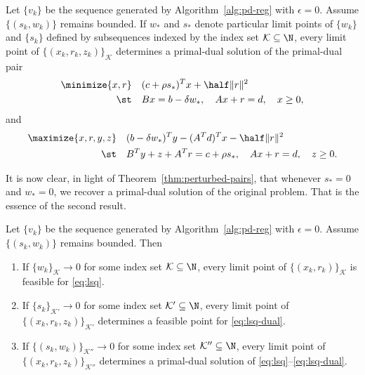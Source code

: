 \documentclass{amsart}
\begin{document}
\begin{btheorem}
  \label{thm:perturbed-pairs}
  Let $\{v_k\}$ be the sequence generated by Algorithm~\ref{alg:pd-reg} with
  $\epsilon = 0$. Assume $\{(s_k, w_k)\}$ remains bounded. If $w_*$ and $s_*$
  denote particular limit points of $\{w_k\}$ and $\{s_k\}$ defined by
  subsequences indexed by the index set $\mathcal{K} \subseteq \N$, every limit
  point of $\{(x_k,r_k,z_k)\}_{\mathcal{K}}$ determines a primal-dual solution
  of the primal-dual pair
  \begin{equation}
    \label{eq:lsq-r-perturbed}
    \begin{aligned}
      \minimize{x, r} \quad & (c + \rho s_*)^T x + \half \|r\|^2 \\
      \st \quad & Bx = b - \delta w_*, \quad Ax + r = d, \quad x \geq 0,
    \end{aligned}
  \end{equation}
  and
  \begin{equation}
    \label{eq:lsq-r-dual-perturbed}
    \begin{aligned}
      \maximize{x, r, y, z} \quad &
        (b - \delta w_*)^T y - (A^T d)^T x - \half \|r\|^2 \\
      \st \quad & B^T y + z + A^T r = c + \rho s_*, \quad
                  Ax + r = d, \quad z \geq 0.
    \end{aligned}
  \end{equation}
\end{btheorem}

It is now clear, in light of Theorem~\ref{thm:perturbed-pairs}, that whenever
$s_* = 0$ and $w_* = 0$, we recover a primal-dual solution of the original
problem. That is the essence of the second result.

\begin{btheorem}
  \label{thm:limit-points}
  Let $\{v_k\}$ be the sequence generated by Algorithm~\ref{alg:pd-reg} with
  $\epsilon = 0$. Assume $\{(s_k, w_k)\}$ remains bounded. Then
  \begin{enumerate}
    \item If $\{w_k\}_{\mathcal{K}} \to 0$ for some index set $\mathcal{K}
      \subseteq \N$, every limit point of $\{(x_k,r_k)\}_{\mathcal{K}}$ is
      feasible for \eqref{eq:lsq}.
    \item If $\{s_k\}_{\mathcal{K}'} \to 0$ for some index set $\mathcal{K}'
      \subseteq \N$, every limit point of $\{(x_k,r_k,z_k)\}_{\mathcal{K}'}$
      determines a feasible point for \eqref{eq:lsq-dual}.
    \item If $\{(s_k,w_k)\}_{\mathcal{K}''} \to 0$ for some index set
      $\mathcal{K}'' \subseteq \N$, every limit point of
      $\{(x_k,r_k,z_k)\}_{\mathcal{K}''}$ determines a primal-dual solution of
      \eqref{eq:lsq}--\eqref{eq:lsq-dual}.
  \end{enumerate}
\end{btheorem}
\end{document}
